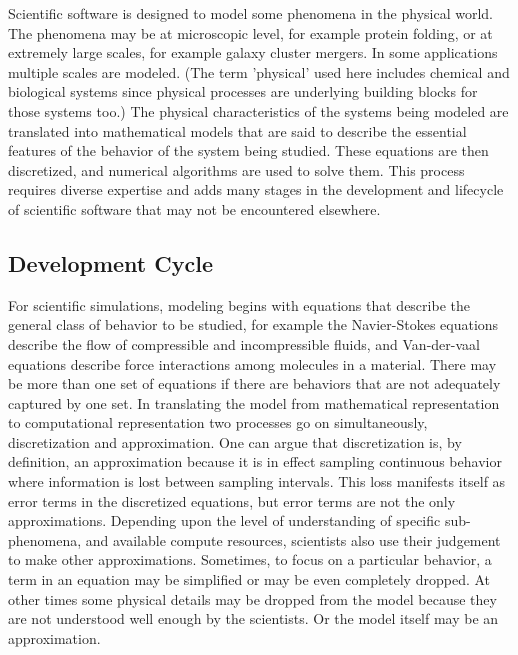 \label{sec:lifecycle} 
Scientific software is designed to model some phenomena in the
physical world. The phenomena may be at microscopic level, for example
protein folding, or at extremely large scales, for example galaxy cluster
mergers.  In some applications multiple scales are modeled.  (The term 'physical' used here includes chemical and
biological systems since physical processes are underlying building
blocks for those systems too.) The physical characteristics of the systems being modeled are
translated into mathematical models that are said to describe the
essential features of the behavior of the system being
studied. These equations are then discretized, and numerical algorithms
are used to solve them. This process requires diverse expertise and
adds many stages in the development and lifecycle of scientific
software that may not be encountered elsewhere. 

\subsection{Development Cycle}
\label{sec:dev-cycle}
For scientific simulations, modeling begins with equations that describe the
general class of behavior to be studied, for example the Navier-Stokes
equations describe the flow of compressible and incompressible
fluids, and Van-der-vaal equations describe force interactions among
molecules in a material. There may be more than one set of equations
if there are behaviors that are not adequately captured by one set.
In translating the model from mathematical representation to
computational representation two processes go on simultaneously,
discretization and approximation. One can argue that discretization is,
by definition, an approximation because it is in effect sampling
continuous behavior where information is lost between sampling
intervals. This loss manifests itself as error terms in the discretized
equations, but error terms are not the only
approximations. Depending upon the level of understanding of specific
sub-phenomena, and available compute resources, scientists also 
use their judgement to make other approximations. Sometimes, to focus on a
particular behavior, a term in an equation may be simplified or may be even completely
dropped. At other times some physical details may be dropped
from the model because they are not understood well enough by the
scientists.  Or the model itself may be an approximation.  

